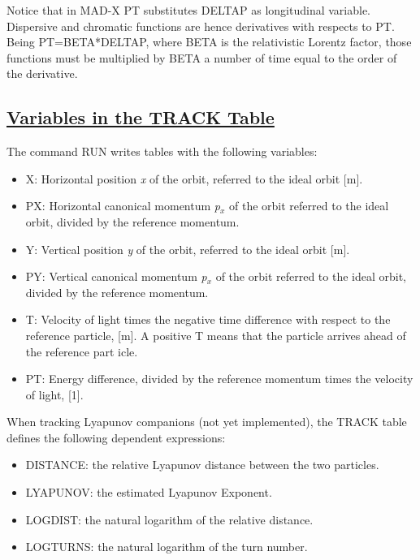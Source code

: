 Notice that in MAD-X PT substitutes DELTAP as longitudinal
variable. Dispersive and chromatic functions are hence derivatives with
respects to PT. Being PT=BETA*DELTAP, where BETA is the relativistic
Lorentz factor, those functions must be multiplied by BETA a number of
time equal to the order of the derivative.  

\subsection{\href{track}{Variables in the TRACK Table}} 
The command RUN writes tables with the following variables: 
\begin{itemize}
   \item X: Horizontal position \textit{x} of the orbit, referred to the
     ideal orbit [m].    
   \item PX: Horizontal canonical momentum \textit{p$_x$} of the orbit
     referred to the ideal orbit, divided by the reference momentum.    
   \item Y: Vertical position \textit{y} of the orbit, referred to the
     ideal orbit [m].    
   \item PY: Vertical canonical momentum \textit{p$_x$} of the orbit
     referred to the ideal orbit, divided by the reference momentum.    
   \item T: Velocity of light times the negative time difference with
     respect to the reference particle, [m]. A positive T means that the
     particle arrives ahead of the reference part icle.   
   \item PT: Energy difference, divided by the reference momentum times
     the velocity of light, [1].    
\end{itemize} 

When tracking Lyapunov companions (not yet implemented), the TRACK table
defines the following dependent expressions:  
\begin{itemize}
   \item DISTANCE: the relative Lyapunov distance between the two
     particles.    
   \item LYAPUNOV: the estimated Lyapunov Exponent.   
   \item LOGDIST: the natural logarithm of the relative distance.   
   \item LOGTURNS: the natural logarithm of the turn number.   
\end{itemize}


